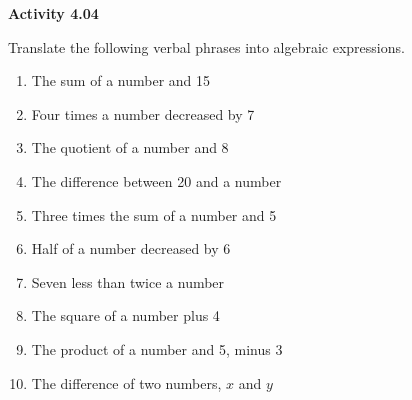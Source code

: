 \vspace{0.3ex}
\noindent\textbf{Activity 4.04}

\vspace{0.2ex}

Translate the following verbal phrases into algebraic expressions. 

\begin{enumerate}
    \item The sum of a number and 15  
    \item Four times a number decreased by 7  
    \item The quotient of a number and 8  
    \item The difference between 20 and a number  
    \item Three times the sum of a number and 5  
    \item Half of a number decreased by 6  
    \item Seven less than twice a number  
    \item The square of a number plus 4  
    \item The product of a number and 5, minus 3  
    \item The difference of two numbers, \(x\) and \(y\)  
\end{enumerate}
